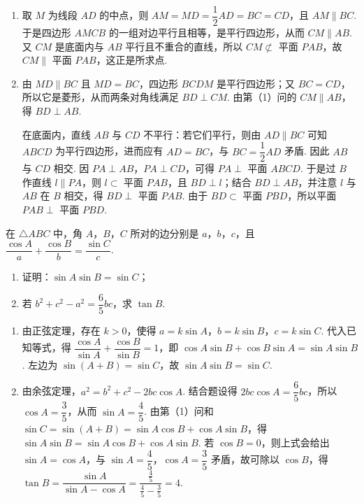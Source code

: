 \begin{solution}
\begin{enumerate}
\item 取 \(M\) 为线段 \(AD\) 的中点，则 \(AM=MD=\dfrac12AD=BC=CD\)，且 \(AM\parallel BC\). 于是四边形 \(AMCB\) 的一组对边平行且相等，是平行四边形，从而 \(CM\parallel AB\). 又 \(CM\) 是底面内与 \(AB\) 平行且不重合的直线，所以 \(CM\not\subset\) 平面 \(PAB\)，故 \(CM\parallel\) 平面 \(PAB\)，这正是所求点.
\item 由 \(MD\parallel BC\) 且 \(MD=BC\)，四边形 \(BCDM\) 是平行四边形；又 \(BC=CD\)，所以它是菱形，从而两条对角线满足 \(BD\perp CM\). 由第（1）问的 \(CM\parallel AB\)，得 \(BD\perp AB\).

在底面内，直线 \(AB\) 与 \(CD\) 不平行：若它们平行，则由 \(AD\parallel BC\) 可知 \(ABCD\) 为平行四边形，进而应有 \(AD=BC\)，与 \(BC=\dfrac12AD\) 矛盾. 因此 \(AB\) 与 \(CD\) 相交. 因 \(PA\perp AB\)，\(PA\perp CD\)，可得 \(PA\perp\) 平面 \(ABCD\). 于是过 \(B\) 作直线 \(l\parallel PA\)，则 \(l\subset\) 平面 \(PAB\)，且 \(BD\perp l\)；结合 \(BD\perp AB\)，并注意 \(l\) 与 \(AB\) 在 \(B\) 相交，得 \(BD\perp\) 平面 \(PAB\). 由于 \(BD\subset\) 平面 \(PBD\)，所以平面 \(PAB\perp\) 平面 \(PBD\).
\end{enumerate}
\end{solution}

\begin{problem}
在 \(\triangle ABC\) 中，角 \(A\)，\(B\)，\(C\) 所对的边分别是 \(a\)，\(b\)，\(c\)，且 \(\dfrac{\cos A}{a}+\dfrac{\cos B}{b}=\dfrac{\sin C}{c}\).

\begin{enumerate}
\item 证明：\(\sin A\sin B=\sin C\)；
\item 若 \(b^2+c^2-a^2=\dfrac65bc\)，求 \(\tan B\).
\end{enumerate}
\end{problem}

\begin{solution}
\begin{enumerate}
\item 由正弦定理，存在 \(k>0\)，使得 \(a=k\sin A\)，\(b=k\sin B\)，\(c=k\sin C\). 代入已知等式，得
\(\dfrac{\cos A}{\sin A}+\dfrac{\cos B}{\sin B}=1\)，即 \(\cos A\sin B+\cos B\sin A=\sin A\sin B\). 左边为 \(\sin(A+B)=\sin C\)，故 \(\sin A\sin B=\sin C\).
\item 由余弦定理，\(a^2=b^2+c^2-2bc\cos A\). 结合题设得 \(2bc\cos A=\dfrac65bc\)，所以 \(\cos A=\dfrac35\)，从而 \(\sin A=\dfrac45\). 由第（1）问和 \(\sin C=\sin(A+B)=\sin A\cos B+\cos A\sin B\)，得
\(\sin A\sin B=\sin A\cos B+\cos A\sin B\). 若 \(\cos B=0\)，则上式会给出 \(\sin A=\cos A\)，与 \(\sin A=\dfrac45\)，\(\cos A=\dfrac35\) 矛盾，故可除以 \(\cos B\)，得 \(\tan B=\dfrac{\sin A}{\sin A-\cos A}=\dfrac{\frac{4}{5}}{\frac{4}{5}-\frac{3}{5}}=4\).
\end{enumerate}
\end{solution}

